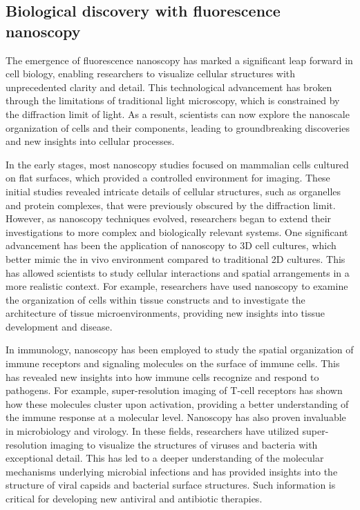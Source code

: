 \subsection{Biological discovery with fluorescence nanoscopy}

The emergence of fluorescence nanoscopy has marked a significant leap forward in cell biology, enabling researchers to visualize cellular structures with unprecedented clarity and detail. This technological advancement has broken through the limitations of traditional light microscopy, which is constrained by the diffraction limit of light. As a result, scientists can now explore the nanoscale organization of cells and their components, leading to groundbreaking discoveries and new insights into cellular processes.

In the early stages, most nanoscopy studies focused on mammalian cells cultured on flat surfaces, which provided a controlled environment for imaging. These initial studies revealed intricate details of cellular structures, such as organelles and protein complexes, that were previously obscured by the diffraction limit. However, as nanoscopy techniques evolved, researchers began to extend their investigations to more complex and biologically relevant systems. One significant advancement has been the application of nanoscopy to 3D cell cultures, which better mimic the in vivo environment compared to traditional 2D cultures. This has allowed scientists to study cellular interactions and spatial arrangements in a more realistic context. For example, researchers have used nanoscopy to examine the organization of cells within tissue constructs and to investigate the architecture of tissue microenvironments, providing new insights into tissue development and disease.

In immunology, nanoscopy has been employed to study the spatial organization of immune receptors and signaling molecules on the surface of immune cells. This has revealed new insights into how immune cells recognize and respond to pathogens. For example, super-resolution imaging of T-cell receptors has shown how these molecules cluster upon activation, providing a better understanding of the immune response at a molecular level. Nanoscopy has also proven invaluable in microbiology and virology. In these fields, researchers have utilized super-resolution imaging to visualize the structures of viruses and bacteria with exceptional detail. This has led to a deeper understanding of the molecular mechanisms underlying microbial infections and has provided insights into the structure of viral capsids and bacterial surface structures. Such information is critical for developing new antiviral and antibiotic therapies. 

